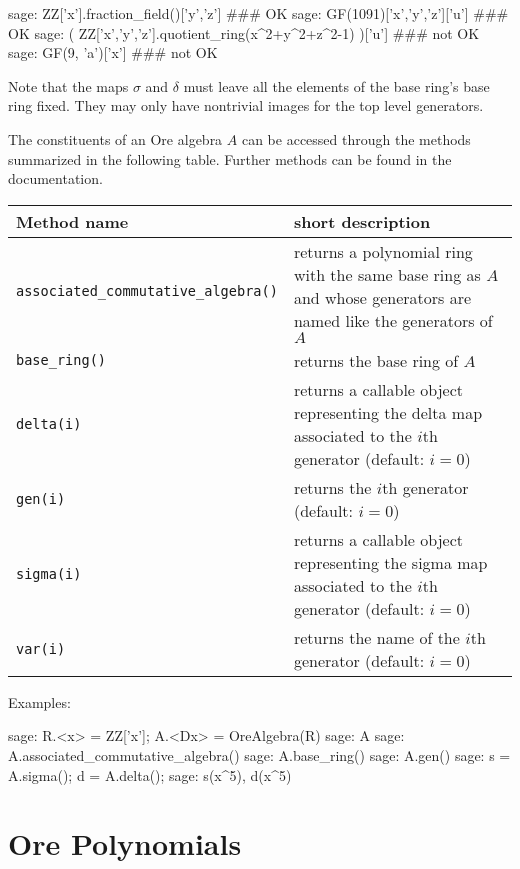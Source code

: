 \documentclass{amsart}
\begin{document}
\begin{sageexample}
  sage: ZZ['x'].fraction_field()['y','z'] ### OK
  sage: GF(1091)['x','y','z']['u'] ### OK
  sage: ( ZZ['x','y','z'].quotient_ring(x^2+y^2+z^2-1) )['u'] ### not OK
  sage: GF(9, 'a')['x'] ### not OK
\end{sageexample}

Note that the maps $\sigma$ and $\delta$ must leave all the elements of
the base ring's base ring fixed. They may only have nontrivial images for
the top level generators. 

The constituents of an Ore algebra $A$ can be accessed through the methods
summarized in the following table. Further methods can be found in the 
documentation. 

\begin{center}
  \begin{tabular}{|l|p{.55\hsize}|}
    \hline
    Method name & short description \\\hline
    \verb|associated_commutative_algebra()| & returns a polynomial ring with the
       same base ring as $A$ and whose generators are named like the generators
       of~$A$\\
    \verb|base_ring()| & returns the base ring of $A$\\
    \verb|delta(i)| & returns a callable object representing the delta map
       associated to the $i$th generator (default: $i=0$) \\
    \verb|gen(i)| & returns the $i$th generator (default: $i=0$)\\
    \verb|sigma(i)| & returns a callable object representing the sigma map
       associated to the $i$th generator (default: $i=0$) \\
    \verb|var(i)| & returns the name of the $i$th generator (default: $i=0$)\\\hline
  \end{tabular}
\end{center}

\smallskip

Examples: 

\begin{sageexample}
  sage: R.<x> = ZZ['x']; A.<Dx> = OreAlgebra(R)
  sage: A
  sage: A.associated_commutative_algebra()
  sage: A.base_ring()
  sage: A.gen()
  sage: s = A.sigma(); d = A.delta(); 
  sage: s(x^5), d(x^5)
\end{sageexample}

\section{Ore Polynomials}\label{sec:3}
\end{document}

